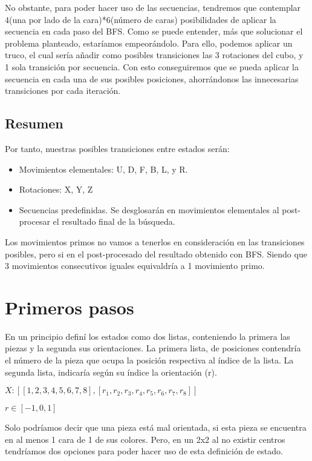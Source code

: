 \documentclass[11pt]{article}
\begin{document}
	No obstante, para poder hacer uso de las secuencias, tendremos que contemplar 4(una por lado de la cara)*6(número de caras) posibilidades de aplicar la secuencia en cada paso del BFS. Como se puede entender, más que solucionar el problema planteado, estaríamos empeorándolo. Para ello, podemos aplicar un truco, el cual sería añadir como posibles transiciones las 3 rotaciones del cubo, y 1 sola transición por secuencia. Con esto conseguiremos que se pueda aplicar la secuencia en cada una de sus posibles posiciones, ahorrándonos las innecesarias transiciones por cada iteración.

\subsection{Resumen}
	Por tanto, nuestras posibles transiciones entre estados serán:
\begin{itemize}
	\item Movimientos elementales: U, D, F, B, L, y R.
	\item Rotaciones: X, Y, Z
	\item Secuencias predefinidas. Se desglosarán en movimientos elementales al post-procesar el resultado final de la búsqueda.
\end{itemize}

	Los movimientos primos no vamos a tenerlos en consideración en las transiciones posibles, pero si en el post-procesado del resultado obtenido con BFS. Siendo que 3 movimientos consecutivos iguales equivaldría a 1 movimiento primo.

\section{Primeros pasos}
	En un principio definí los estados como dos listas, conteniendo la primera las piezas y la segunda sus orientaciones. La primera lista, de posiciones contendría el número de la pieza que ocupa la posición respectiva al índice de la lista. La segunda lista, indicaría según su índice la orientación (r).\bigskip


	$X:[[1, 2, 3, 4, 5, 6, 7, 8], [r_1, r_2, r_3, r_4, r_5, r_6, r_7, r_8]]$
	
	$r \in [-1, 0, 1]$

	Solo podríamos decir que una pieza está mal orientada, si esta pieza se encuentra en al menos 1 cara de 1 de sus colores. Pero, en un 2x2 al no existir centros tendríamos dos opciones para poder hacer uso de esta definición de estado.
\end{document}
